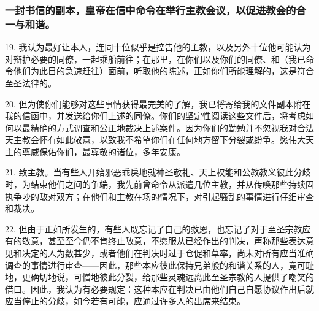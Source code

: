 
\subsubsection{一封书信的副本，皇帝在信中命令在举行主教会议，以促进教会的合一与和谐。}

\par

19. 我认为最好让本人，连同十位似乎是控告他的主教，以及另外十位他可能认为对辩护必要的同僚，一起乘船前往；在那里，在你们以及你们的同僚、和（我已命令他们为此目的急速赶往）面前，听取他的陈述，正如你们所能理解的，这是符合至圣法律的。\par

20. 但为使你们能够对这些事情获得最完美的了解，我已将寄给我的文件副本附在我的信函中，并发送给你们上述的同僚。你们的坚定性阅读这些文件后，将考虑如何以最精确的方式调查和公正地裁决上述案件。因为你们的勤勉并不忽视我对合法天主教会怀有如此敬意，以致我不希望你们在任何地方留下分裂或纷争。愿伟大天主的尊威保佑你们，最尊敬的诸位，多年安康。\par

\par

21. 致主教。当有些人开始邪恶乖戾地就神圣敬礼、天上权能和公教教义彼此分歧时，为结束他们之间的争端，我先前曾命令从派遣几位主教，并从传唤那些持续固执争吵的敌对双方；在他们和主教在场的情况下，对引起骚乱的事情进行仔细审查和裁决。\par

22. 但由于正如所发生的，有些人既忘记了自己的救恩，也忘记了对于至圣宗教应有的敬意，甚至至今仍不肯终止敌意，不愿服从已经作出的判决，声称那些表达意见和决定的人为数甚少，或者他们在判决时过于仓促和草率，尚未对所有应当准确调查的事情进行审查——因此，那些本应彼此保持兄弟般的和谐关系的人，竟可耻地，更确切地说，可憎地彼此分裂，给那些灵魂远离此至圣宗教的人提供了嘲笑的借口。因此，我认为有必要规定：这种本应在判决已由他们自己自愿协议作出后就应当停止的分歧，如今若有可能，应通过许多人的出席来结束。\par

